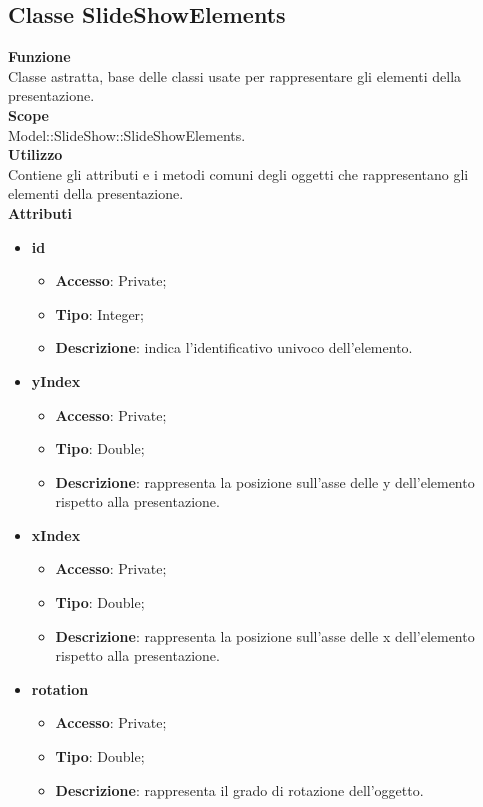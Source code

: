 	\subsection{Classe SlideShowElements}{
		\textbf{Funzione}\\
			\indent Classe astratta, base delle classi usate per rappresentare gli elementi della presentazione.\\
		\textbf{Scope}\\
			\indent Model::SlideShow::SlideShowElements.\\
		\textbf{Utilizzo}\\
			\indent Contiene gli attributi e i metodi comuni degli oggetti che rappresentano gli elementi della presentazione.\\
		\textbf{Attributi}
		\begin{itemize}
			\item \textbf{id}
			\begin{itemize}
				\item \textbf{Accesso}: Private;
				\item \textbf{Tipo}: Integer;
				\item \textbf{Descrizione}: indica l’identificativo univoco dell’elemento.
			\end{itemize}
			\item \textbf{yIndex}
			\begin{itemize}
				\item \textbf{Accesso}: Private;
				\item \textbf{Tipo}: Double;
				\item \textbf{Descrizione}: rappresenta la posizione sull’asse delle y dell’elemento rispetto alla presentazione.
			\end{itemize}
			\item \textbf{xIndex}
			\begin{itemize}
				\item \textbf{Accesso}: Private;
				\item \textbf{Tipo}: Double;
				\item \textbf{Descrizione}: rappresenta la posizione sull’asse delle x dell’elemento rispetto alla presentazione.
			\end{itemize}
			\item \textbf{rotation}
			\begin{itemize}
				\item \textbf{Accesso}: Private;
				\item \textbf{Tipo}: Double;
				\item \textbf{Descrizione}: rappresenta il grado di rotazione dell’oggetto.

\end{itemize}
\end{itemize}}

